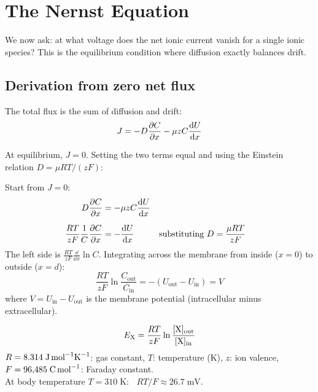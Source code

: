 \section{The Nernst Equation}
\label{sec:nernst}

We now ask: at what voltage does the net ionic current vanish for a single ionic species? This is the equilibrium condition where diffusion exactly balances drift.

\subsection{Derivation from zero net flux}

The total flux is the sum of diffusion and drift:
%
\begin{equation}
  J = -D \frac{\partial C}{\partial x} - \mu z C \frac{\mathop{}\!\mathrm{d} U}{\mathop{}\!\mathrm{d} x}
  \label{eq:total-flux}
\end{equation}

At equilibrium, $J = 0$. Setting the two terms equal and using the Einstein relation $D = \mu RT / (zF)$:

\begin{derivation}
Start from $J = 0$:
\begin{align*}
  D \frac{\partial C}{\partial x} &= -\mu z C \frac{\mathop{}\!\mathrm{d} U}{\mathop{}\!\mathrm{d} x} \\[6pt]
  \frac{RT}{zF} \frac{1}{C}\frac{\partial C}{\partial x} &= -\frac{\mathop{}\!\mathrm{d} U}{\mathop{}\!\mathrm{d} x}
    && \text{substituting } D = \frac{\mu RT}{zF}
\end{align*}
The left side is $\frac{RT}{zF}\frac{\dd}{\dd x}\ln C$. Integrating across the membrane from inside ($x = 0$) to outside ($x = d$):
\[
  \frac{RT}{zF}\ln\frac{C_{\text{out}}}{C_{\text{in}}} = -(U_{\text{out}} - U_{\text{in}}) = V
\]
where $V = U_{\text{in}} - U_{\text{out}}$ is the membrane potential (intracellular minus extracellular).
\end{derivation}

\begin{keyequation}
\begin{equation}
  E_{\mathrm{X}} = \frac{RT}{zF}\ln\frac{[\mathrm{X}]_{\text{out}}}{[\mathrm{X}]_{\text{in}}}
  \label{eq:nernst}
\end{equation}
\tcblower
$R = 8.314\;\text{J\,mol}^{-1}\text{K}^{-1}$: gas constant, \quad
$T$: temperature (K), \quad
$z$: ion valence, \quad
$F = 96{,}485\;\text{C\,mol}^{-1}$: Faraday constant. \\[4pt]
At body temperature $T = 310\;\text{K}$: $\;\;RT/F \approx 26.7\;\text{mV}$.
\end{keyequation}

